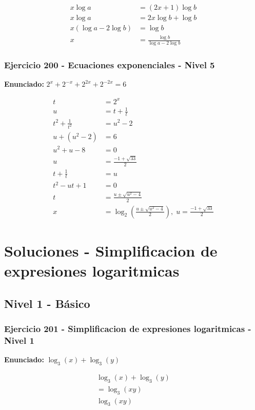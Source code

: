 \documentclass[12pt,a4paper]{article}
\begin{document}
\[
\begin{aligned}
x\log a&=(2x+1)\log b\\
x\log a&=2x\log b+\log b\\
x(\log a-2\log b)&=\log b\\
x&=\boxed{\frac{\log b}{\log a-2\log b}}
\end{aligned}
\]


\subsubsection*{Ejercicio 200 - Ecuaciones exponenciales - Nivel 5}
\textbf{Enunciado:} \(2^x+2^{-x}+2^{2x}+2^{-2x}=6\)

\[
\begin{aligned}
t&=2^x\\
u&=t+\frac1t\\
t^2+\frac1{t^2}&=u^2-2\\
u+(u^2-2)&=6\\
u^2+u-8&=0\\
u&=\frac{-1+\sqrt{33}}2\\
t+\frac1t&=u\\
t^2-ut+1&=0\\
t&=\frac{u\pm\sqrt{u^2-4}}2\\
x&=\boxed{\log_2\left(\frac{u\pm\sqrt{u^2-4}}2\right),\;u=\frac{-1+\sqrt{33}}2}
\end{aligned}
\]


\newpage
\section*{Soluciones - Simplificacion de expresiones logaritmicas}

\subsection*{Nivel 1 - Básico}

\subsubsection*{Ejercicio 201 - Simplificacion de expresiones logaritmicas - Nivel 1}
\textbf{Enunciado:} \(\log_{3}\left(x\right)+\log_{3}\left(y\right)\)

\[
\begin{aligned}
\log_{3}\left(x\right)+\log_{3}\left(y\right)\\
=\log_{3}\left(xy\right)\\
\boxed{\log_{3}\left(xy\right)}
\end{aligned}
\]
\end{document}

